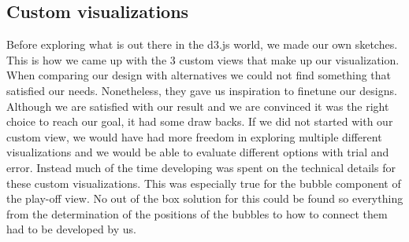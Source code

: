 \documentclass[]{sigchi}
\begin{document}
\subsection{Custom visualizations}
Before exploring what is out there in the d3.js world, we made our own sketches.
This is how we came up with the 3 custom views that make up our visualization.
When comparing our design with alternatives we could not find something that
satisfied our needs. Nonetheless, they gave us inspiration to finetune our
designs. Although we are satisfied with our result and we are convinced it was
the right choice to reach our goal, it had some draw backs. If we did not started with our custom view, we would have had more freedom in exploring multiple different visualizations and we would be able to evaluate different options with trial and error. Instead much of the time developing was spent on the technical details for these custom visualizations. This was especially true for the bubble component of the play-off view. No out of the box solution for this could be found so everything from the determination of the positions of the bubbles to how to connect them had to be developed by us.
\end{document}
